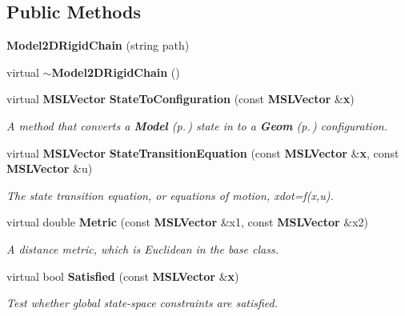 \subsection*{Public Methods}
\begin{CompactItemize}
\item 
{\bf Model2DRigid\-Chain} (string path)
\item 
virtual {\bf $\sim$Model2DRigid\-Chain} ()
\item 
virtual {\bf MSLVector} {\bf State\-To\-Configuration} (const {\bf MSLVector} \&{\bf x})
\begin{CompactList}\small\item\em A method that converts a {\bf Model} {\rm (p.\,\pageref{classModel})} state in to a {\bf Geom} {\rm (p.\,\pageref{classGeom})} configuration.\item\end{CompactList}\item 
virtual {\bf MSLVector} {\bf State\-Transition\-Equation} (const {\bf MSLVector} \&{\bf x}, const {\bf MSLVector} \&u)
\begin{CompactList}\small\item\em The state transition equation, or equations of motion, xdot=f(x,u).\item\end{CompactList}\item 
virtual double {\bf Metric} (const {\bf MSLVector} \&x1, const {\bf MSLVector} \&x2)
\begin{CompactList}\small\item\em A distance metric, which is Euclidean in the base class.\item\end{CompactList}\item 
virtual bool {\bf Satisfied} (const {\bf MSLVector} \&{\bf x})
\begin{CompactList}\small\item\em Test whether global state-space constraints are satisfied.\item\end{CompactList}\end{CompactItemize}
